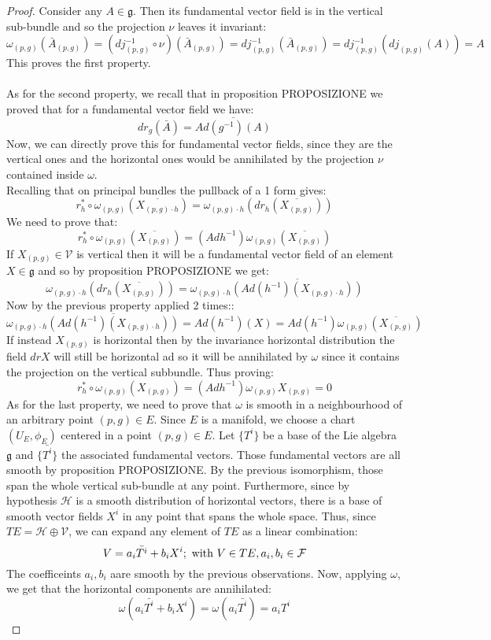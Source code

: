 \documentclass[12pt,a4paper]{report}
\theoremstyle{definition}
\theoremstyle{Theorem}
\theoremstyle{definition}
\theoremstyle{definition}
\begin{document}
		\begin{proof}
			Consider any $A\in\mathfrak{g}$. Then its fundamental vector field is in the vertical sub-bundle and so the projection $\nu$ leaves it invariant:
			$$\omega_{(p,g)}(\bar{A}_{(p,g)})=(dj_{(p,g)}^{-1}\circ \nu)(\bar{A}_{(p,g)})=dj_{(p,g)}^{-1}(\bar{A}_{(p,g)})=
			dj_{(p,g)}^{-1}(dj_{(p,g)}(A))=A$$
			This proves the first property.\\
			\\
			As for the second property, we recall that in proposition PROPOSIZIONE we proved that for a fundamental vector field  we have:
			$$dr_g(\bar{A})=\overline{Ad(g^{-1})(A)}$$
			Now, we can directly prove this for fundamental vector fields, since they are the vertical ones and the horizontal ones would be annihilated by the projection $\nu$ contained inside $\omega$. \\
			Recalling that on principal bundles the pullback of a 1 form gives:
			$$r^*_h\circ \omega_{(p,g)}(\overline{X_{(p,g)\cdot h}})=\omega_{(p,g)\cdot h}(dr_h(\overline{X_{(p,g)}}))$$
			We need to prove that:
			$$r^*_h\circ \omega_{(p,g)}(\overline{X_{(p,g)}})=(Adh^{-1})\omega_{(p,g)}(\overline{X_{(p,g)}})$$
			If $X_{(p,g)}\in\mathcal{V}$ is vertical then it will be a fundamental vector field of an element $X\in\mathfrak{g}$ and so by proposition PROPOSIZIONE we get:
			$$\omega_{(p,g)\cdot h}(dr_h(\overline{X_{(p,g)}}))=\omega_{(p,g)\cdot h}\overline{(Ad(h^{-1})(X_{(p,g)\cdot h}))}$$
			Now by the previous property applied 2 times::
			$$\omega_{(p,g)\cdot h}\overline{(Ad(h^{-1})(X_{(p,g)\cdot h}))}=Ad(h^{-1})(X)=Ad(h^{-1})\omega_{(p,g)}(\overline{X_{(p,g)}})$$
			If instead $X_{(p,g)}$ is horizontal then by the invariance horizontal distribution the field $dr X$ will still be horizontal ad so it will be annihilated by $\omega$ since it contains the projection on the vertical subbundle. Thus proving:
			$$r^*_h\circ \omega_{(p,g)}(X_{(p,g)})=(Adh^{-1})\omega_{(p,g)}X_{(p,g)}=0$$
			As for the last property, we need to prove that $\omega$ is smooth in a neighbourhood of an arbitrary point $(p,g)\in E$. Since $E$ is a manifold, we choose a chart $(U_E,\phi_E)$ centered in a point $(p,g)\in E$. Let $\{T^i\}$ be a base of the Lie algebra $\mathfrak{g}$ and $\{\bar{T^i}\}$ the associated fundamental vectors. Those fundamental vectors are all smooth by proposition PROPOSIZIONE. By the previous isomorphism, those span the whole vertical sub-bundle at any point. Furthermore, since by hypothesis $\mathcal{H}$ is a smooth distribution  of horizontal vectors, there is a base of smooth vector fields $X^i$ in any point that spans the whole space. Thus, since $TE=\mathcal{H}\oplus\mathcal{V}$, we can expand any element of $TE$ as a linear combination:
			$$V=a_i \bar{T^i}+b_iX^i;\hbox{ with } V\in TE, a_i,b_i\in \mathcal{F}$$
			The coefficeints $a_i,b_i$ aare smooth by the previous observations. Now, applying $\omega$, we get that the horizontal components are annihilated:
			$$\omega(a_i \bar{T^i}+b_iX^i)=\omega(a_i \bar{T^i})=a_i T^i$$
		\end{proof}
\end{document}

